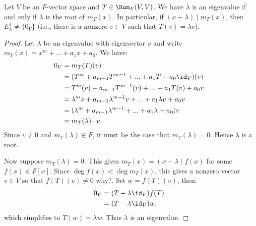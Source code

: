     \begin{theorem}
        Let $V$ be an $F$-vector space and $T \in \Hom_F{(V,V)}$. We have $\lambda$ is an eigenvalue if and only if $\lambda$ is the root of $m_T(x)$. In particular, if $(x-\lambda) \mid m_T(x)$, then $E_\lambda^1 \neq \{0_V\}$ (i.e., there is a nonzero $v \in V$ such that $T(v) = \lambda v$).
    \end{theorem}
        \begin{proof}
            Let $\lambda$ be an eigenvalue with eigenvector $v$ and write $m_T(x) = x^m + ... + a_1 x + a_0$. We have:
                \begin{equation*}
                \begin{split}
                    0_V
                    & = m_T(T)(v) \\
                    & = (T^m + a_{m-1}T^{m-1} + ... + a_1 T + a_0 \id_V)(v) \\
                    & = T^m(v) + a_{m-1}T^{m-1}(v) + ... + a_1T(v) + a_0v \\
                    & = \lambda^m v + a_{m-1}\lambda^{m-1}v + ... + a_1 \lambda v + a_0 v \\
                    & = (\lambda^m  + a_{m-1}\lambda^{m-1} + ... + a_1 \lambda  + a_0)v \\
                    & = m_T(\lambda)\cdot v.
                \end{split}
                \end{equation*}
            Since $v \neq 0$ and $m_T(\lambda) \in F$, it must be the case that $m_T(\lambda) = 0$. Hence $\lambda$ is a root.

            Now suppose $m_T(\lambda) = 0$. This gives $m_T(x) = (x-\lambda)f(x)$ for some $f(x) \in F[x]$. Since $\deg{f(x)} < \deg{m_T(x)}$, this gives a nonzero vector $v \in V$ so that $f(T)(v) \neq 0$ {\color{red} why?}. Set $w = f(T)(v)$, then:
                \begin{equation*}
                \begin{split}
                    0_V
                    & = (T-\lambda \id_V)f(T) \\
                    & = (T - \lambda \id_V)w,
                \end{split}
                \end{equation*}
            which simplifies to $T(w) = \lambda w$. Thus $\lambda$ is an eigenvalue.
        \end{proof}

